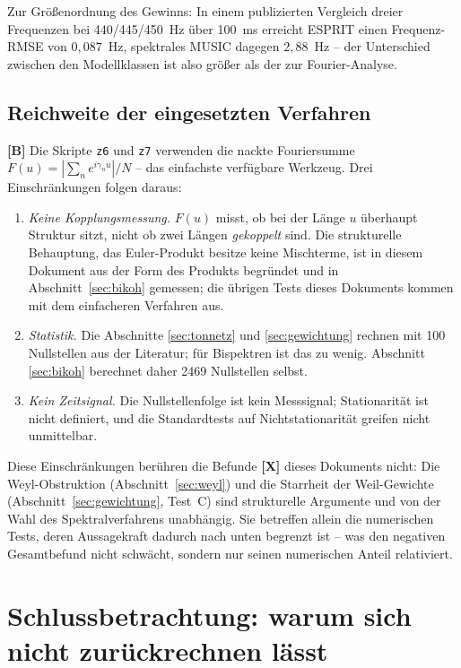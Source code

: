 Zur Gr\"o\ss enordnung des Gewinns: In einem publizierten Vergleich
dreier Frequenzen bei 440/445/450~Hz \"uber 100~ms erreicht ESPRIT
einen Frequenz-RMSE von $0{,}087$~Hz, spektrales MUSIC dagegen
$2{,}88$~Hz -- der Unterschied zwischen den Modellklassen ist also
gr\"o\ss er als der zur Fourier-Analyse.

\subsection{Reichweite der eingesetzten Verfahren}

\textbf{[B]} Die Skripte \texttt{z6} und \texttt{z7} verwenden die
nackte Fouriersumme
$F(u) = |\sum_n e^{i\gamma_n u}|/N$ -- das einfachste verf\"ugbare
Werkzeug. Drei Einschr\"ankungen folgen daraus:

\begin{enumerate}
  \item \emph{Keine Kopplungsmessung.} $F(u)$ misst, ob bei der
    L\"ange $u$ \"uberhaupt Struktur sitzt, nicht ob zwei L\"angen
    \emph{gekoppelt} sind. Die strukturelle Behauptung, das
    Euler-Produkt besitze keine Mischterme, ist in diesem Dokument
    aus der Form des Produkts begr\"undet und in
    Abschnitt~\ref{sec:bikoh} gemessen; die \"ubrigen Tests dieses
    Dokuments kommen mit dem einfacheren Verfahren aus.
  \item \emph{Statistik.} Die Abschnitte \ref{sec:tonnetz} und
    \ref{sec:gewichtung} rechnen mit 100 Nullstellen aus der
    Literatur; f\"ur Bispektren ist das zu wenig. Abschnitt
    \ref{sec:bikoh} berechnet daher 2469 Nullstellen selbst.
  \item \emph{Kein Zeitsignal.} Die Nullstellenfolge ist kein
    Messsignal; Stationarit\"at ist nicht definiert, und die
    Standardtests auf Nichtstationarit\"at greifen nicht unmittelbar.
\end{enumerate}

Diese Einschr\"ankungen ber\"uhren die Befunde \textbf{[X]} dieses
Dokuments nicht: Die Weyl-Obstruktion
(Abschnitt~\ref{sec:weyl}) und die Starrheit der Weil-Gewichte
(Abschnitt~\ref{sec:gewichtung}, Test~C) sind strukturelle Argumente
und von der Wahl des Spektralverfahrens unabh\"angig. Sie betreffen
allein die numerischen Tests, deren Aussagekraft dadurch nach unten
begrenzt ist -- was den negativen Gesamtbefund nicht schw\"acht,
sondern nur seinen numerischen Anteil relativiert.

\section{Schlussbetrachtung: warum sich nicht zur\"uckrechnen l\"asst}


